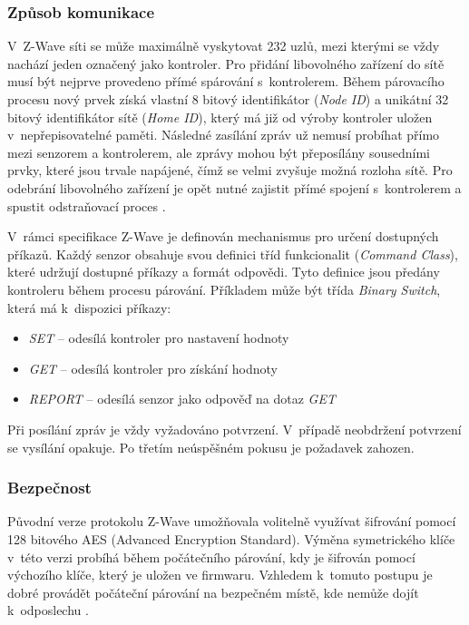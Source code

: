  \subsubsection{Způsob komunikace}
 V~Z-Wave síti se může maximálně vyskytovat 232 uzlů, mezi kterými se vždy nachází jeden označený
 jako kontroler. Pro přidání libovolného zařízení do sítě musí být nejprve provedeno přímé spárování
 s~kontrolerem. Během párovacího procesu nový prvek získá vlastní 8 bitový identifikátor (\textit{Node ID}) a 
 unikátní 32 bitový identifikátor sítě (\textit{Home ID}), který má již od výroby kontroler uložen v~nepřepisovatelné paměti.
 Následné zasílání zpráv už nemusí probíhat přímo mezi senzorem a kontrolerem, ale zprávy mohou
 být přeposílány sousedními prvky, které jsou trvale napájené, čímž se velmi zvyšuje možná rozloha sítě. 
 Pro odebrání libovolného zařízení je opět nutné zajistit přímé spojení s~kontrolerem a spustit odstraňovací
 proces \cite{cesnet-survey}.
 
 V~rámci specifikace Z-Wave \cite{zwave-spec} je definován mechanismus pro určení dostupných příkazů. Každý senzor obsahuje
 svou definici tříd funkcionalit (\textit{Command Class}), které udržují dostupné příkazy a formát odpovědi. Tyto definice
 jsou předány kontroleru během procesu párování. Příkladem může být třída \textit{Binary Switch}, která má k~dispozici příkazy:
 \begin{itemize}
 \item \textit{SET} -- odesílá kontroler pro nastavení hodnoty 
 \item \textit{GET} -- odesílá kontroler pro získání hodnoty  
 \item \textit{REPORT} -- odesílá senzor jako odpověď na dotaz \textit{GET} 
 \end{itemize} 
 
 Při posílání zpráv je vždy vyžadováno potvrzení. V~případě neobdržení potvrzení se vysílání opakuje. 
 Po třetím neúspěšném pokusu je požadavek zahozen.
 
 \subsubsection{Bezpečnost}
 Původní verze protokolu Z-Wave umožňovala volitelně využívat šifrování pomocí 128 bitového AES (Advanced Encryption Standard).
 Výměna symetrického klíče v~této verzi probíhá během počátečního párování, kdy je šifrován pomocí
 výchozího
 klíče, který je uložen ve firmwaru. Vzhledem k~tomuto postupu je dobré provádět počáteční párování na bezpečném
 místě, kde nemůže dojít k~odposlechu \cite{zwave-S0-attack}.
 
